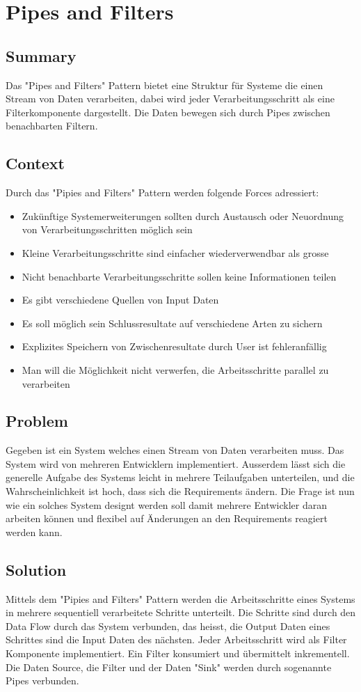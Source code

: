 \chapter{Pipes and Filters}

\section{Summary}
Das "Pipes and Filters" Pattern bietet eine Struktur für Systeme die einen Stream von Daten verarbeiten, dabei wird jeder Verarbeitungsschritt als eine Filterkomponente dargestellt. Die Daten bewegen sich durch Pipes zwischen benachbarten Filtern.  
\section{Context}
Durch das "Pipies and Filters" Pattern werden folgende Forces adressiert: 
\begin{itemize}
	\item Zukünftige Systemerweiterungen sollten durch Austausch oder Neuordnung von Verarbeitungsschritten möglich sein
	\item Kleine Verarbeitungsschritte sind einfacher wiederverwendbar als grosse
	\item Nicht benachbarte Verarbeitungsschritte sollen keine Informationen teilen
	\item Es gibt verschiedene Quellen von Input Daten
	\item Es soll möglich sein Schlussresultate auf verschiedene Arten zu sichern
	\item Explizites Speichern von Zwischenresultate durch User ist fehleranfällig
	\item Man will die Möglichkeit nicht verwerfen, die Arbeitsschritte parallel zu verarbeiten
\end{itemize}


\section{Problem}
Gegeben ist ein System welches einen Stream von Daten verarbeiten muss. Das System wird von mehreren Entwicklern implementiert. Ausserdem lässt sich die generelle Aufgabe des Systems leicht in mehrere Teilaufgaben unterteilen, und die Wahrscheinlichkeit ist hoch, dass sich die Requirements ändern. Die Frage ist nun wie ein solches System designt werden soll damit mehrere Entwickler daran arbeiten können und flexibel auf Änderungen an den Requirements reagiert werden kann.
\section{Solution}
Mittels dem "Pipies and Filters" Pattern werden die Arbeitsschritte eines Systems in mehrere sequentiell verarbeitete Schritte unterteilt. Die Schritte sind durch den Data Flow durch das System verbunden, das heisst, die Output Daten eines Schrittes sind die Input Daten des nächsten. Jeder Arbeitsschritt wird als Filter Komponente implementiert. Ein Filter konsumiert und übermittelt inkrementell. Die Daten Source, die Filter und der Daten "Sink" werden durch sogenannte Pipes verbunden. 

